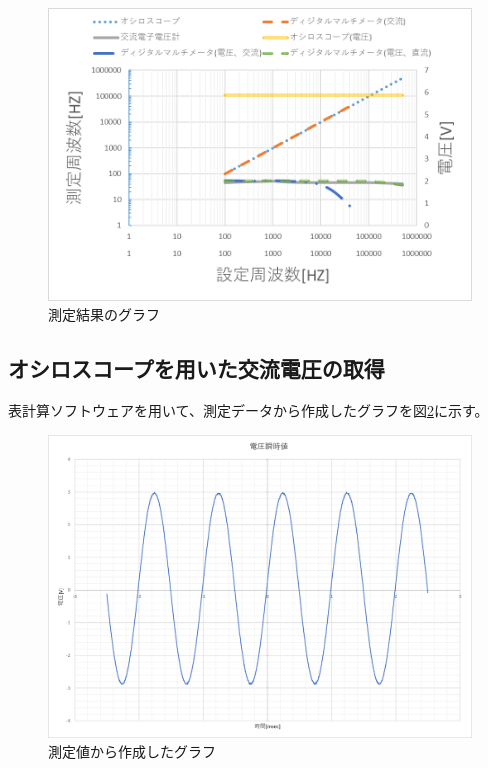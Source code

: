 \documentclass[dvipdfmx]{jsarticle}
\begin{document}
\begin{figure}[h]
  \centering
  \includegraphics[scale=1]{image001.png}
  \caption{測定結果のグラフ}
  \label{fig:result_graph}
\end{figure}

\subsection{オシロスコープを用いた交流電圧の取得}
表計算ソフトウェアを用いて、測定データから作成したグラフを図\ref{fig:result_graph2}に示す。
\begin{figure}[h]
  \centering
  \includegraphics[scale=0.5]{image2.png}
  \caption{測定値から作成したグラフ}
  \label{fig:result_graph2}
\end{figure}
\end{document}

